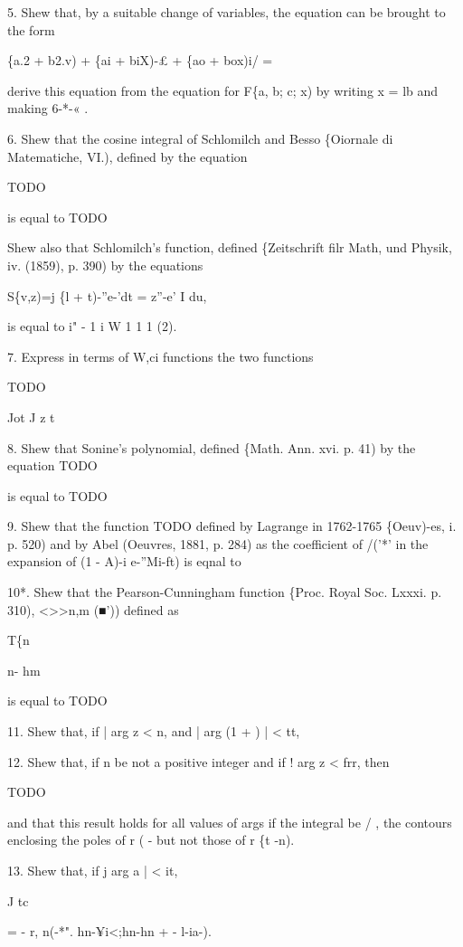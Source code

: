 5. Shew that, by a suitable change of variables, the equation can be
brought to the form

\{a.2 + b2.v) + \{ai + biX)-£ + \{ao + box)i/ =

derive this equation from the equation for F\{a, b; c; x) by writing x
= lb and making 6-*-« .

6. Shew that the cosine integral of Schlomilch and Besso \{Oiornale di
Matematiche, VI.), defined by the equation

TODO

is equal to TODO

Shew also that Schlomilch's function, defined \{Zeitschrift filr Math,
und Physik, iv. (1859), p. 390) by the equations

S\{v,z)=j \{l + t)-''e-'dt = z''-e' I du,

is equal to i" - 1 i W  1  1  1  (2).

7. Express in terms of W,ci functions the two functions

TODO

Jot J z t

8. Shew that Sonine's polynomial, defined \{Math. Ann. xvi. p. 41) by
the equation TODO

is equal to TODO

%
%

9. Shew that the function TODO defined by Lagrange in 1762-1765
\{Oeuv)-es, i. p. 520) and by Abel (Oeuvres, 1881, p. 284) as the
coefficient of /('*' in the expansion of (1 - A)-i e-''Mi-ft) is eqnal
to

10*. Shew that the Pearson-Cunningham function \{Proc. Royal Soc.
Lxxxi. p. 310), <>>n,m (■')) defined as

T\{n

n- hm

is equal to  TODO

11. Shew that, if | arg z < n, and | arg (1 + ) | < tt,


12. Shew that, if n be not a positive integer and if ! arg z < frr,
then

TODO

and that this result holds for all values of args if the integral be /
, the contours enclosing the poles of r ( - but not those of r \{t
-n).

13. Shew that, if j arg a | < it,

J tc

= - r, n(-*". hn-¥i<;hn-hn + - l-ia-).

